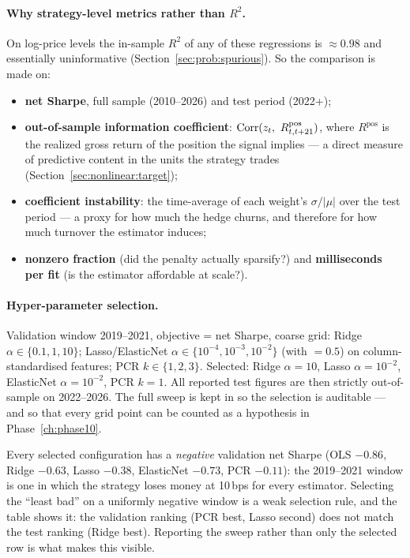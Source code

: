 \paragraph{Why strategy-level metrics rather than $R^2$.} On log-price levels the in-sample
$R^2$ of any of these regressions is $\approx0.98$ and essentially uninformative
(Section~\ref{sec:prob:spurious}). So the comparison is made on:
\begin{itemize}
  \item \textbf{net Sharpe}, full sample (2010--2026) and test period (2022+);
  \item \textbf{out-of-sample information coefficient}: $\operatorname{Corr}(z_t,\ R^{\text{pos}}_{t,t+21})$,
    where $R^{\text{pos}}$ is the realized gross return of the position the signal implies
    --- a direct measure of predictive content in the units the strategy trades
    (Section~\ref{sec:nonlinear:target});
  \item \textbf{coefficient instability}: the time-average of each weight's
    $\sigma/|\mu|$ over the test period --- a proxy for how much the hedge churns, and
    therefore for how much turnover the estimator induces;
  \item \textbf{nonzero fraction} (did the penalty actually sparsify?) and
    \textbf{milliseconds per fit} (is the estimator affordable at scale?).
\end{itemize}

\paragraph{Hyper-parameter selection.} Validation window 2019--2021, objective = net
Sharpe, coarse grid: Ridge $\alpha\in\{0.1,1,10\}$; Lasso/ElasticNet
$\alpha\in\{10^{-4},10^{-3},10^{-2}\}$ (with $=0.5$) on
column-standardised features; PCR $k\in\{1,2,3\}$. Selected: Ridge $\alpha=10$,
Lasso $\alpha=10^{-2}$, ElasticNet $\alpha=10^{-2}$, PCR $k=1$. All reported test figures
are then strictly out-of-sample on 2022--2026. The full sweep is kept in
 so the selection is auditable --- and so
that every grid point can be counted as a hypothesis in Phase~\ref{ch:phase10}.

\begin{remark}
Every selected configuration has a \emph{negative} validation net Sharpe (OLS $-0.86$,
Ridge $-0.63$, Lasso $-0.38$, ElasticNet $-0.73$, PCR $-0.11$): the 2019--2021 window is
one in which the strategy loses money at 10\,bps for every estimator. Selecting the
``least bad'' on a uniformly negative window is a weak selection rule, and the table shows
it: the validation ranking (PCR best, Lasso second) does not match the test ranking (Ridge
best). Reporting the sweep rather than only the selected row is what makes this visible.
\end{remark}

